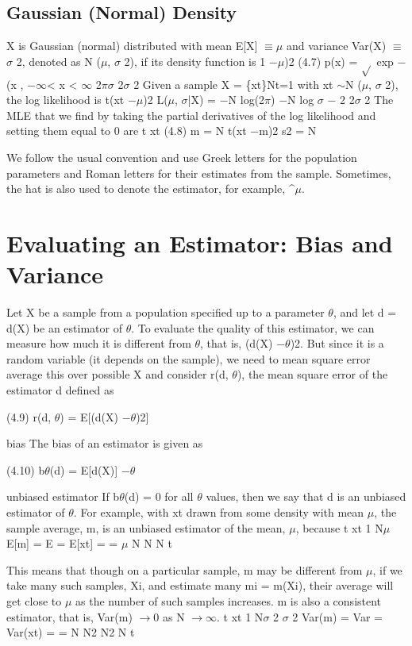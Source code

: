 \subsection{Gaussian (Normal) Density}

X is Gaussian (normal) distributed with mean E[X] $\equiv$$\mu$ and variance Var(X) $\equiv$$\sigma$ 2, denoted as N ($\mu$, $\sigma$ 2), if its density function is 1 $-$$\mu$)2 (4.7) p(x) = $\sqrt{}$ exp $-$(x , $-$$\infty$< x < $\infty$ 2$\pi$$\sigma$ 2$\sigma$ 2 Given a sample X = \{xt\}Nt=1 with xt $\sim$N ($\mu$, $\sigma$ 2), the log likelihood is t(xt $-$$\mu$)2 L($\mu$, $\sigma$|X) = $-$N log(2$\pi$) $-$N log $\sigma$ $-$ 2 2$\sigma$ 2 The MLE that we find by taking the partial derivatives of the log likelihood and setting them equal to 0 are t xt (4.8) m = N t(xt $-$m)2 s2 = N

We follow the usual convention and use Greek letters for the population parameters and Roman letters for their estimates from the sample. Sometimes, the hat is also used to denote the estimator, for example, \textasciicircum{}$\mu$.

\section{Evaluating an Estimator: Bias and Variance}

Let X be a sample from a population specified up to a parameter $\theta$, and let d = d(X) be an estimator of $\theta$. To evaluate the quality of this estimator, we can measure how much it is different from $\theta$, that is, (d(X) $-$$\theta$)2. But since it is a random variable (it depends on the sample), we need to mean square error average this over possible X and consider r(d, $\theta$), the mean square error of the estimator d defined as

(4.9) r(d, $\theta$) = E[(d(X) $-$$\theta$)2]

bias The bias of an estimator is given as

(4.10) b$\theta$(d) = E[d(X)] $-$$\theta$

unbiased estimator If b$\theta$(d) = 0 for all $\theta$ values, then we say that d is an unbiased estimator of $\theta$. For example, with xt drawn from some density with mean $\mu$, the sample average, m, is an unbiased estimator of the mean, $\mu$, because t xt 1 N$\mu$ E[m] = E = E[xt] = = $\mu$ N N N t

This means that though on a particular sample, m may be different from $\mu$, if we take many such samples, Xi, and estimate many mi = m(Xi), their average will get close to $\mu$ as the number of such samples increases. m is also a consistent estimator, that is, Var(m) $\to$0 as N $\to$$\infty$. t xt 1 N$\sigma$ 2 $\sigma$ 2 Var(m) = Var = Var(xt) = = N N2 N2 N t

